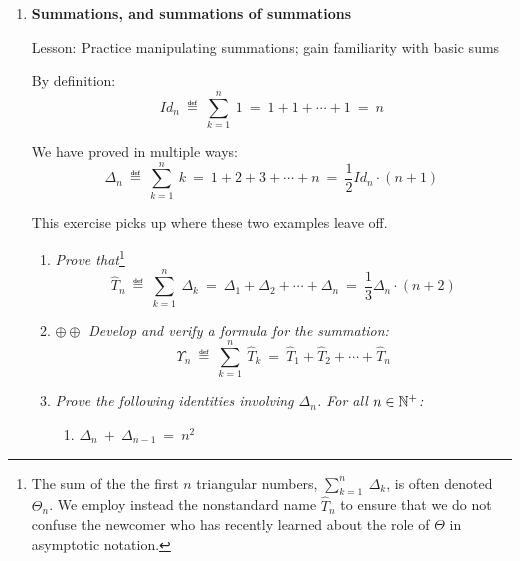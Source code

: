\begin{enumerate}
{\em For clarification:}
The partitioning step operates as follows:
{\footnotesize
\[ 
\begin{array}{ll}
S^{(H)} 
             & = \ 1 \ + \ {1 \over 2} + {1 \over 3} + {1 \over 4} + {1 \over 5} + {1 \over 6}+ {1 \over 7} + {1 \over 8} + {1 \over 9} + {1 \over 10}+ {1 \over 11}  +{1 \over 12} + {1 \over 13} + {1 \over 14}+ {1 \over 15} + \cdots \\
             & \\
  & = \ (1)  +  \left( {1 \over 2} + {1 \over 3} \right)  +  \left( {1 \over 4} + {1 \over 5} + {1 \over 6}+ {1 \over 7} \right)  +  \left( {1 \over 8} + {1 \over 9} + {1 \over 10}+ {1 \over 11}  +{1 \over 12} + {1 \over 13} + {1 \over 14}+ {1 \over 15} \right) \ +\cdots
\end{array} \]
}

\item
{\bf Summations, and summations of summations}

{\sc Lesson:} Practice manipulating summations; gain familiarity with basic sums

\smallskip

By definition:
\[ Id_n \ \eqdef \ \sum_{k=1}^n \ 1 \ = \ 1 + 1 + \cdots +1 \  = \ n \]

We have proved in multiple ways:
\[ \Delta_n \ \eqdef \  \sum_{k=1}^n \ k \ = \ 1+2+3+ \cdots +n \ = \ \frac{1}{2} Id_n \cdot (n+1) \]

\smallskip

This exercise picks up where these two examples leave off.

  \begin{enumerate}
  \item 
{\em Prove that}\footnote{The sum of the the first $n$ triangular numbers, $\sum_{k=1}^n \ \Delta_k$, is often denoted $\Theta_n$.  We employ instead the nonstandard name $\widehat{T}_n$ to ensure that we do not confuse the newcomer who has recently learned about the role of $\Theta$ in asymptotic notation.} 
\[ \widehat{T}_n \ \eqdef \  \sum_{k=1}^n \ \Delta_k \ = \   
\Delta_1 + \Delta_2 + \cdots + \Delta_n \ = \ \frac{1}{3} \Delta_n \cdot (n+2) \]

  \item
$\oplus \oplus$
{\em Develop and verify a formula for the summation:}
\[ \Upsilon_n  \ \eqdef \  \sum_{k=1}^n \ \widehat{T}_k \ = \  
\widehat{T}_1 + \widehat{T}_2 + \cdots + \widehat{T}_n \]

  \item
{\em Prove the following identities involving $\Delta_n$.  For all $n \in \mathbb{N}^+$:}
    \begin{enumerate}
    \item
$\Delta_n \ + \ \Delta_{n-1} \ = \ n^2$


\end{enumerate}
\end{enumerate}
\end{enumerate}
